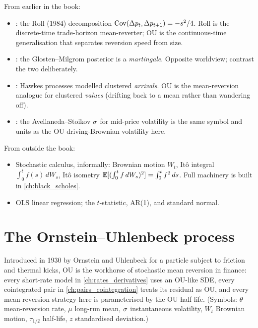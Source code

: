 \begin{backgroundbox}[Prerequisites]
From earlier in the book:
\begin{itemize}
  \item {}: the Roll (1984) decomposition
  $\operatorname{Cov}(\Delta p_t, \Delta p_{t+1}) = -s^2/4$. Roll is the
  discrete-time trade-horizon mean-reverter; OU is the
  continuous-time generalisation that separates reversion speed
  from size.
  \item {}: the Glosten--Milgrom posterior is a
  \emph{martingale}. Opposite worldview; contrast the two
  deliberately.
  \item {}: Hawkes processes modelled clustered
  \emph{arrivals}. OU is the mean-reversion analogue for
  clustered \emph{values} (drifting back to a mean rather than
  wandering off).
  \item {}: the Avellaneda--Stoikov
  $\sigma$ for mid-price volatility is the same symbol and units
  as the OU driving-Brownian volatility here.
\end{itemize}
From outside the book:
\begin{itemize}
  \item Stochastic calculus, informally: Brownian motion $W_t$,
  It\^o integral $\int_0^t f(s)\, dW_s$, It\^o isometry
  $\mathbb{E}[(\int_0^t f\, dW_s)^2] = \int_0^t f^2\, ds$. Full
  machinery is built in \cref{ch:black_scholes}.
  \item OLS linear regression; the $t$-statistic, AR(1), and
  standard normal.
\end{itemize}
\end{backgroundbox}

\section{The Ornstein--Uhlenbeck process}
\label{sec:ch9_ou}

Introduced in 1930 by Ornstein and Uhlenbeck for a particle
subject to friction and thermal kicks, OU is the workhorse of
stochastic mean reversion in finance: every short-rate model in
\cref{ch:rates_derivatives} uses an OU-like SDE, every
cointegrated pair in \cref{ch:pairs_cointegration} treats its
residual as OU, and every mean-reversion strategy here is
parameterised by the OU half-life. (Symbols: $\theta$
mean-reversion rate, $\mu$ long-run mean, $\sigma$ instantaneous
volatility, $W_t$ Brownian motion, $\tau_{1/2}$ half-life, $z$
standardised deviation.)


